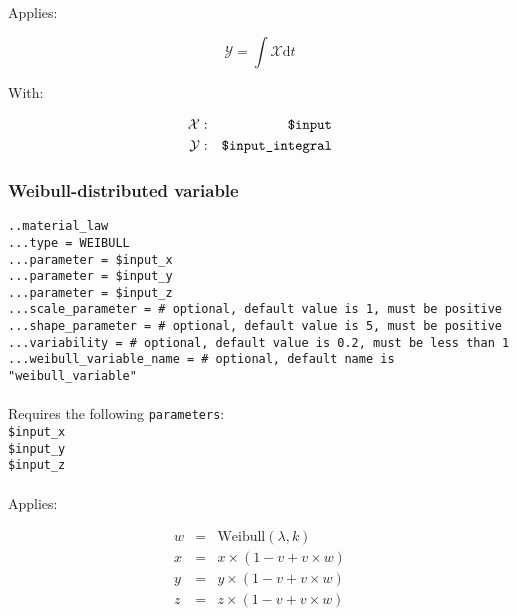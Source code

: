 \documentclass[10pt]{article}
\begin{document}
\paragraph{}Applies:

\begin{equation}
	\mathcal{Y} = \int\limits \mathcal{X} \mathrm{d}t
\end{equation}

With:

\begin{eqnarray}
	\mathcal{X} & : & \verb+$input+ \notag \\
	\mathcal{Y} & : & \verb+$input_integral+ \notag
\end{eqnarray}

\subsubsection{Weibull-distributed variable}

\noindent \verb+..material_law+\\
\verb+...type = WEIBULL+\\
\verb+...parameter = $input_x+\\
\verb+...parameter = $input_y+\\
\verb+...parameter = $input_z+\\
\verb+...scale_parameter = # optional, default value is 1, must be positive+\\
\verb+...shape_parameter = # optional, default value is 5, must be positive+\\
\verb+...variability = # optional, default value is 0.2, must be less than 1+\\
\verb+...weibull_variable_name = # optional, default name is "weibull_variable"+\\


\paragraph{}Requires the following \verb+parameters+:\\

\noindent \verb+$input_x+\\
\verb+$input_y+\\
\verb+$input_z+

\paragraph{}Applies:

\begin{eqnarray}
	w & = & \text{Weibull}(\lambda, k) \\
	x & = & x \times ( 1 - v + v \times w ) \\
	y & = & y \times ( 1 - v + v \times w ) \\
	z & = & z \times ( 1 - v + v \times w ) \\
\end{eqnarray}
\end{document}
